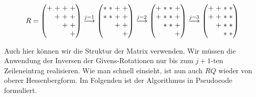 \documentclass{article}
\theoremstyle{plain}
\begin{document}
\begin{align*}
	\setlength\arraycolsep{1.5pt}
	R
	=
	\begin{pmatrix}
		+ & + & + & + \\
		 & + & + & + \\
		&  & + & + \\
		& & & + \\
	\end{pmatrix}
	\stackrel{j=1}{\longrightarrow}
	\begin{pmatrix}
		* & * & + & + \\
		* & * & + & + \\
		&  & + & + \\
		& & & + \\
	\end{pmatrix}
	\stackrel{j=2}{\longrightarrow}
	\begin{pmatrix}
		+ & * & * & + \\
		+ & * & * & + \\
		& * &*  & + \\
		& & & + \\
	\end{pmatrix}
	\stackrel{j=3}{\longrightarrow}
	\begin{pmatrix}
		+ & + & * & * \\
		+ & + & * & * \\
		& + &*  & * \\
		& & *& * \\
	\end{pmatrix}
\end{align*}

Auch hier können wir die Struktur der Matrix verwenden. Wir müssen die Anwendung der Inversen der Givens-Rotationen nur bis zum $j+1$-ten Zeileneintrag realisieren. Wie man schnell einsieht, ist nun auch $RQ$ wieder von oberer Hessenbergform. Im Folgenden ist der Algorithmus in Pseudocode formuliert.
\end{document}
